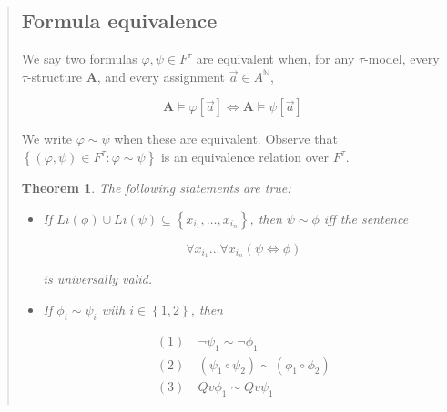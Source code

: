 \documentclass[a4paper, 12pt]{article}
\newtheorem{theorem}{Theorem}
\theoremstyle{definition}
\theoremstyle{definition}
\theoremstyle{definition}
\begin{document}
\begin{quote}
\subsection{Formula equivalence}

We say two formulas $\varphi, \psi \in F^{\tau}$ are equivalent when, for any $\tau$-model,
every $\tau$-structure $\textbf{A}$, and every assignment $\overrightarrow{a} \in A^\mathbb{N}$,

\begin{equation*}
    \textbf{A} \vDash \varphi[\overrightarrow{a}] \iff \textbf{A} \vDash \psi[\overrightarrow{a}]
\end{equation*}

We write $\varphi \sim \psi$ when these are equivalent. Observe that $\left\{
(\varphi, \psi) \in F^\tau: \varphi \sim \psi \right\} $ is an equivalence
relation over $F^\tau$.

\begin{theorem}
    The following statements are true: 

    \begin{itemize}
        \item If $Li(\phi) \cup Li(\psi) \subseteq \left\{ x_{i_1},\ldots, x_{i_n} \right\} $, then 
            $\psi \sim \phi$ iff the sentence 

            \begin{equation*}
                \forall x_{i_1} \ldots \forall x_{i_n} \left( \psi \iff \phi \right) 
            \end{equation*}

            is universally valid.

        \item If $\phi_i \sim \psi_i$ with $i \in \left\{ 1, 2 \right\} $, then 

            \begin{align*}
                (1)~ &\neg \psi_1 \sim \neg \phi_1 \\ 
                (2)~ &(\psi_1 \circ \psi_2)\sim (\phi_1 \circ \phi_2) \\ 
                (3)~ &Qv\phi_1 \sim Qv\psi_1\\
            \end{align*}


\end{itemize}
\end{theorem}
\end{quote}
\end{document}
